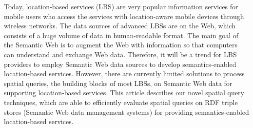 
Today, location-based services (LBS) are very popular information
services for mobile users who access the services with
location-aware mobile devices through wireless networks. The data
sources of advanced LBSs are on the Web, which consists of a huge
volume of data in human-readable format. The main goal of the
Semantic Web is to augment the Web with information so that
computers can understand and exchange Web data. Therefore, it will
be a trend for LBS providers to employ Semantic Web data sources
to develop semantics-enabled location-based services. However,
there are currently limited solutions to process spatial queries,
the building blocks of most LBSs, on Semantic Web data for
supporting location-based services. This article describes our
novel spatial query techniques, which are able to efficiently
evaluate spatial queries on RDF triple stores (Semantic Web data
management systems) for providing semantics-enabled location-based
services.

